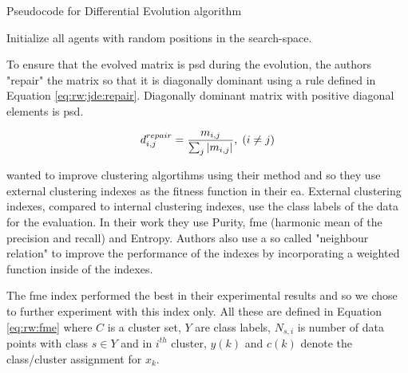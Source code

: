 \documentclass[12pt,a4paper]{report}
\begin{document}

\begin{algorithm}[t]
\caption{Pseudocode for Differential Evolution algorithm} \label{pseudo:de}
\DontPrintSemicolon
\LinesNumbered
{}
Initialize all agents with random positions in the search-space.\;
\end{algorithm} 

To ensure that the evolved matrix is \ac{psd} during the evolution, the authors "repair" the matrix so that it is diagonally dominant using a rule defined in Equation \ref{eq:rw:jde:repair}. Diagonally dominant matrix with positive diagonal elements is \ac{psd}.

\begin{equation}
d_{i,j}^{repair} = \frac{m_{i,j}}{\sum_j \left|{m_{i,j}}\right|}, \; (i \neq j)
\label{eq:rw:jde:repair}
\end{equation}

\cite{fukui2013evolutionary} wanted to improve clustering algortihms using their method and so they use external clustering indexes as the fitness function in their \acl{ea}. External clustering indexes, compared to internal clustering indexes, use the class labels of the data for the evaluation. In their work they use Purity, \ac{fme} (harmonic mean of the precision and recall) and Entropy. Authors also use a so called "neighbour relation" to improve the performance of the indexes by incorporating a weighted function inside of the indexes. 

The \acl{fme} index performed the best in their experimental results and so we chose to further experiment with this index only. All these are defined in Equation \ref{eq:rw:fme} where $C$ is a cluster set, $Y$ are class labels, $N_{s,i}$ is number of data points with class $s \in Y$ and in $i^{th}$ cluster, $y(k)$ and $c(k)$ denote the class/cluster assignment for $x_k$.
\end{document}
